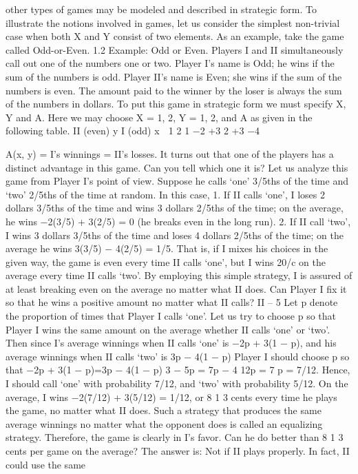 other types of games may be modeled and described in strategic form.
To illustrate the notions involved in games, let us consider the simplest non-trivial
case when both X and Y consist of two elements. As an example, take the game called
Odd-or-Even.
1.2 Example: Odd or Even. Players I and II simultaneously call out one of the
numbers one or two. Player I’s name is Odd; he wins if the sum of the numbers is odd.
Player II’s name is Even; she wins if the sum of the numbers is even. The amount paid to
the winner by the loser is always the sum of the numbers in dollars. To put this game in
strategic form we must specify X, Y and A. Here we may choose X = {1, 2}, Y = {1, 2},
and A as given in the following table.
II (even) y
I (odd) x

1 2
1 −2 +3
2 +3 −4

A(x, y) = I’s winnings = II’s losses.
It turns out that one of the players has a distinct advantage in this game. Can you
tell which one it is?
Let us analyze this game from Player I’s point of view. Suppose he calls ‘one’ 3/5ths
of the time and ‘two’ 2/5ths of the time at random. In this case,
1. If II calls ‘one’, I loses 2 dollars 3/5ths of the time and wins 3 dollars 2/5ths of the
time; on the average, he wins −2(3/5) + 3(2/5) = 0 (he breaks even in the long run).
2. If II call ‘two’, I wins 3 dollars 3/5ths of the time and loses 4 dollars 2/5ths of the time;
on the average he wins 3(3/5) − 4(2/5) = 1/5.
That is, if I mixes his choices in the given way, the game is even every time II calls
‘one’, but I wins 20/c on the average every time II calls ‘two’. By employing this simple
strategy, I is assured of at least breaking even on the average no matter what II does. Can
Player I fix it so that he wins a positive amount no matter what II calls?
II – 5
Let p denote the proportion of times that Player I calls ‘one’. Let us try to choose p
so that Player I wins the same amount on the average whether II calls ‘one’ or ‘two’. Then
since I’s average winnings when II calls ‘one’ is −2p + 3(1 − p), and his average winnings
when II calls ‘two’ is 3p − 4(1 − p) Player I should choose p so that
−2p + 3(1 − p)=3p − 4(1 − p)
3 − 5p = 7p − 4
12p = 7
p = 7/12.
Hence, I should call ‘one’ with probability 7/12, and ‘two’ with probability 5/12. On the
average, I wins −2(7/12) + 3(5/12) = 1/12, or 8 1
3 cents every time he plays the game, no
matter what II does. Such a strategy that produces the same average winnings no matter
what the opponent does is called an equalizing strategy.
Therefore, the game is clearly in I’s favor. Can he do better than 8 1
3 cents per game
on the average? The answer is: Not if II plays properly. In fact, II could use the same
